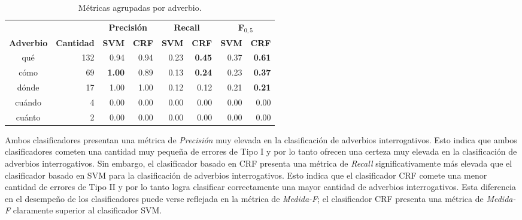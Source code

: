 \documentclass[runningheads,a4paper]{llncs}
\begin{document}
\begin{table}[ht]
 	\renewcommand{\arraystretch}{1.3}
	\renewcommand{\tabcolsep}{3pt}
	\caption{Métricas agrupadas por adverbio.}
	\label{table:metricas-adv}
	\centering
	\begin{tabular}{c r r r r r r r}
		\hline
		\multicolumn{2}{c}{} 
			& \multicolumn{2}{c}{\textbf{Precisión}} 
			& \multicolumn{2}{c}{\textbf{Recall}} 
			& \multicolumn{2}{c}{\textbf{F$_{0,5}$}} \\
		\multicolumn{1}{c}{\textbf{Adverbio}} & \multicolumn{1}{c}{\textbf{Cantidad}}
			& \multicolumn{1}{r}{\textbf{SVM}} & \multicolumn{1}{r}{\textbf{CRF}}
			& \multicolumn{1}{r}{\textbf{SVM}} & \multicolumn{1}{r}{\textbf{CRF}}
			& \multicolumn{1}{r}{\textbf{SVM}} & \multicolumn{1}{r}{\textbf{CRF}} \\		
		\hline\hline
		qué & 132 	& 0.94 & 0.94 			& 0.23 & \textbf{0.45} 	& 0.37 & \textbf{0.61} \\
		cómo & 69 	& \textbf{1.00} & 0.89 	& 0.13 & \textbf{0.24} 	& 0.23 & \textbf{0.37} \\
		dónde & 17 	& 1.00 & 1.00 			& 0.12 & 0.12			& 0.21 & \textbf{0.21} \\
		cuándo & 4 	& 0.00 & 0.00 			& 0.00 & 0.00 			& 0.00 & 0.00 \\
		cuánto & 2 	& 0.00 & 0.00 			& 0.00 & 0.00 			& 0.00 & 0.00 \\
		\hline
	\end{tabular}
\end{table}

Ambos clasificadores presentan una métrica de \emph{Precisión} muy elevada en la clasificación de adverbios interrogativos. Esto indica que ambos clasificadores cometen una cantidad muy pequeña de errores de Tipo I y por lo tanto ofrecen una certeza muy elevada en la clasificación de adverbios interrogativos. Sin embargo, el clasificador basado en CRF presenta una m\'etrica de \emph{Recall} significativamente m\'as elevada que el clasificador basado en SVM para la clasificaci\'on de adverbios interrogativos. Esto indica que el clasificador CRF comete una menor cantidad de errores de Tipo II y por lo tanto logra clasificar correctamente una mayor cantidad de adverbios interrogativos. Esta diferencia en el desempeño de los clasificadores puede verse reflejada en la m\'etrica de \emph{Medida-F}; el clasificador CRF presenta una m\'etrica de \emph{Medida-F} claramente superior al clasificador SVM.
\end{document}
